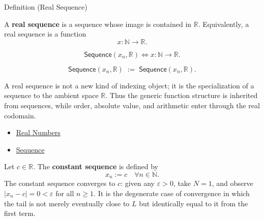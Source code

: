 \begin{definitionbox}{Definition (Real Sequence)}
\begin{definition}
\label{def:real-sequence}

A \textbf{real sequence} is a sequence whose image is contained in
$\mathbb{R}$. Equivalently, a real sequence is a function
\[
    x : \mathbb{N} \to \mathbb{R}.
\]
\end{definition}
\end{definitionbox}

\begin{remark*}
\[
\mathsf{Sequence}(x_n,\mathbb{R})
\Longleftrightarrow
x:\mathbb{N}\to\mathbb{R}.
\]
\end{remark*}

\begin{remark*}
\[
\mathsf{Sequence}(x_n,\mathbb{R})
\;:=\;
\mathsf{Sequence}(x_n,\mathbb{R}).
\]
\end{remark*}

\begin{remark*}[Interpretation]
A real sequence is not a new kind of indexing object; it is the
specialization of a sequence to the ambient space $\mathbb{R}$. Thus the
generic function structure is inherited from sequences, while order,
absolute value, and arithmetic enter through the real codomain.
\end{remark*}

\begin{dependencies}
\begin{itemize}
  \item \hyperref[def:reals]{Real Numbers}
  \item \hyperref[def:sequence]{Sequence}
\end{itemize}
\end{dependencies}

\begin{exposition}
\label{ex:constant-sequence}

Let $c \in \mathbb{R}$. The \textbf{constant sequence} is defined by
\[
    x_n := c \quad \forall n \in \mathbb{N}.
\]
The constant sequence converges to $c$: given any $\varepsilon > 0$,
take $N = 1$, and observe $|x_n - c| = 0 < \varepsilon$ for all $n \ge 1$.
It is the degenerate case of convergence in which the tail is not merely
eventually close to $L$ but identically equal to it from the first term.
\end{exposition}

